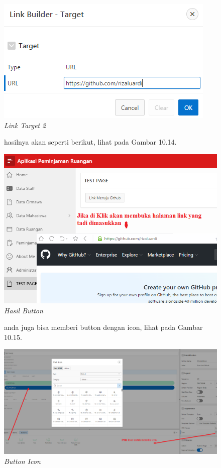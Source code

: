 \begin{enumerate}
\begin{figure}
        \centering
        \includegraphics[scale=0.65]{figures/bab10/12.png}
        \caption{\textit{Link Target 2}}
        \label{Link Target 2}
    \end{figure}
	\begin{figure}
	\item hasilnya akan seperti berikut, lihat pada Gambar 10.14.
	
        \centering
        \includegraphics[scale=0.5]{figures/bab10/13.png}
        \caption{\textit{Hasil Button}}
        \label{Hasil Button}
    \end{figure}
	\begin{figure}
	\item anda juga bisa memberi button dengan icon, lihat pada Gambar 10.15.

        \centering
        \includegraphics[scale=0.25]{figures/bab10/14.png}
        \caption{\textit{Button Icon}}
        \label{Button Icon}
    \end{figure}

\end{enumerate}

 





